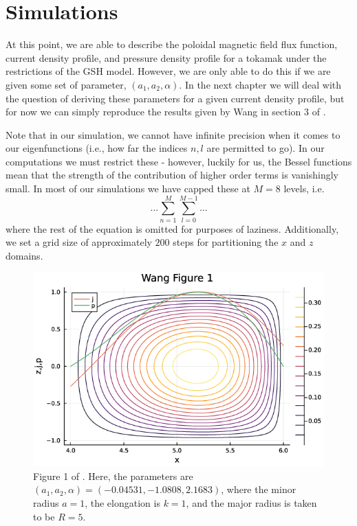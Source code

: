 \section{Simulations}
At this point, we are able to describe the poloidal magnetic field flux function, current density profile, and pressure density profile for a 
tokamak under the restrictions of the GSH model. However, we are only able to do this if we are given some set of parameter, $(a_1, a_2, \alpha)$. 
In the next chapter we will deal with the question of deriving these parameters for a given current density profile, but for now we can simply reproduce 
the results given by Wang in section 3 of \cite{wang-analytic-solution}.

\begin{remark}
    Note that in our simulation, we cannot have infinite precision when it comes to our eigenfunctions (i.e., how far the indices 
    $n,l$ are permitted to go). In our computations we must restrict these - however, luckily for us, the Bessel functions mean that the strength 
    of the contribution of higher order terms is vanishingly small. In most of our simulations we have capped these at $M = 8$ levels, i.e. 
    $$\dots \sum_{n =1}^{M} \sum_{l = 0}^{M-1} \dots$$
    where the rest of the equation is omitted for purposes of laziness. Additionally, we set a grid size of approximately $200$ steps for 
    partitioning the $x$ and $z$ domains.
\end{remark}

\begin{figure}[h!]
    \centering
    \includegraphics[scale=0.6]{imgs/c3/wang-fig-1.png}
    \caption{Figure 1 of \cite{wang-analytic-solution}. Here, the parameters are $(a_1, a_2, \alpha) = (-0.04531, -1.0808, 2.1683)$, 
    where the minor radius $a = 1$, the elongation is $k = 1$, and the major radius is taken to be $R = 5$.}
\end{figure}


